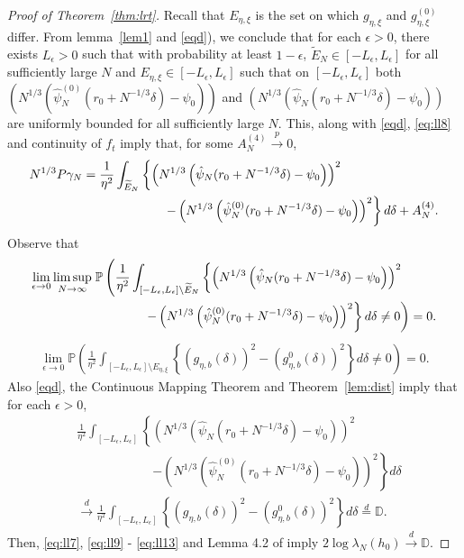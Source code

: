 \documentclass[12pt]{amsart}
\theoremstyle{plain}
\theoremstyle{remark}
\numberwithin{equation}{section}
\begin{document}
\begin{proof}[Proof of Theorem~\ref{thm:lrt}]
Recall that $E_{\eta,\xi}$ is the set on which $g_{\eta,\xi}$ and $g^{(0)}_{\eta,\xi}$ differ. From lemma~\ref{lem1} and \eqref{eqd}), we conclude that for each $\epsilon > 0$, there exists $L_\epsilon > 0$ such that with probability at least $1-\epsilon$, $\widetilde{E}_{N} \in [-L_\epsilon, L_\epsilon]$ for all sufficiently large $N$ and $E_{\eta,\xi} \in [-L_\epsilon, L_\epsilon]$ such that on $[-L_\epsilon, L_\epsilon]$ both $\left(N^{1/3}\left(\hat{\psi}_{N}^{(0)}(r_0 + N^{-1/3}\delta)-\psi_0\right)\right)$ and $\left(N^{1/3}\left(\hat{\psi}_{N}(r_0 + N^{-1/3}\delta)-\psi_0\right)\right)$ are uniformly bounded for all sufficiently large $N$. This, along with \eqref{eqd}, \eqref{eq:ll8} and continuity of $f_t$ imply that, for some $A^{(4)}_N \stackrel{p}{\to} 0$,
\begin{align}\label{eq:ll9}
    N^{1/3}P\gamma_{N} &= \frac{1}{\eta^2}\int_{\widetilde{E}_{N}}\left\{\left(N^{1/3}\left(\hat{\psi}_{N}(r_0 + N^{-1/3}\delta)-\psi_0\right)\right)^{2} \right. \\ &\hspace{2.25cm}\left. -\left(N^{1/3}\left(\hat{\psi}_{N}^{(0)}(r_0 + N^{-1/3}\delta)-\psi_0\right)\right)^{2}\right\}d\delta + A^{(4)}_N. \nonumber 
\end{align}
Observe that
\begin{align}\label{eq:ll10}
    \lim_{\epsilon \to 0} \limsup_{N\to\infty} &\hspace{.1cm}\mathbb{P}\left(\frac{1}{\eta^2}\int_{[-L_\epsilon, L_\epsilon]\setminus\widetilde{E}_{N}}\left\{\left(N^{1/3}\left(\hat{\psi}_{N}(r_0 + N^{-1/3}\delta)-\psi_0\right)\right)^{2} \right.\right. \nonumber \\ &\qquad\qquad\left.\left. -\left(N^{1/3}\left(\hat{\psi}_{N}^{(0)}(r_0 + N^{-1/3}\delta)-\psi_0\right)\right)^{2}\right\}d\delta \neq 0\right) = 0.
\end{align}
\begin{align}\label{eq:ll12}
    \lim_{\epsilon \to 0} \mathbb{P}\left(\frac{1}{\eta^2}\int_{[-L_\epsilon, L_\epsilon]\setminus{E}_{\eta,\xi}}\left\{\left(g_{\eta, b}(\delta)\right)^{2}-\left(g_{\eta, b}^{0}(\delta)\right)^{2}\right\} d \delta \neq 0\right) = 0.
\end{align}
Also \eqref{eqd}, the Continuous Mapping Theorem and Theorem~\ref{lem:dist} imply that for each $\epsilon > 0$,
\begin{align}\label{eq:ll13}
    &\frac{1}{\eta^2}\int_{[-L_\epsilon, L_\epsilon]}\left\{\left(N^{1/3}\left(\hat{\psi}_{N}(r_0 + N^{-1/3}\delta)-\psi_0\right)\right)^{2} \right.\nonumber \\ &\qquad\qquad\qquad\left. -\left(N^{1/3}\left(\hat{\psi}_{N}^{(0)}(r_0 + N^{-1/3}\delta)-\psi_0\right)\right)^{2}\right\}d\delta \nonumber \\ &\stackrel{d}{\to} \frac{1}{\eta^2}\int_{[-L_\epsilon, L_\epsilon]}\left\{\left(g_{\eta, b}(\delta)\right)^{2}-\left(g_{\eta, b}^{0}(\delta)\right)^{2}\right\} d \delta \stackrel{d}{=} \mathbb{D}.
\end{align}
Then, \eqref{eq:ll7}, \eqref{eq:ll9} - \eqref{eq:ll13} and Lemma 4.2 of \cite{MR267677} imply $2 \log \lambda_{N}(h_0) \stackrel{d}{\to} \mathbb{D}$.
\end{proof}
\end{document}
